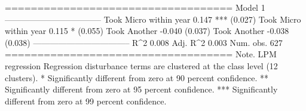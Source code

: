 
===================================
                        Model 1    
-----------------------------------
Took Micro within year    0.147 ***
                         (0.027)   
Took Micro within year    0.115 *  
                         (0.055)   
Took Another             -0.040    
                         (0.037)   
Took Another             -0.038    
                         (0.038)   
-----------------------------------
R^2                       0.008    
Adj. R^2                  0.003    
Num. obs.               627        
===================================
Note. LPM regression Regression disturbance terms are clustered at the class level (12 clusters). * Significantly different from zero at 90 percent confidence. ** Significantly different from zero at 95 percent confidence. *** Significantly different from zero at 99 percent confidence.

